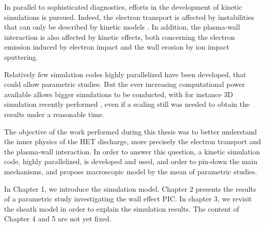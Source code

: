In parallel to sophisticated diagnostics, efforts in the development of kinetic simulations is pursued.
Indeed, the electron transport is affected by instabilities that can only be described by kinetic models \citep{adam2008a,lafleur2016a}.
In addition, the plasma-wall interaction is also affected by kinetic effects, both concerning the electron emission induced by electron impact \citep{barral2003a,raitses2011,sydorenko2006} and the wall erosion by ion impact sputtering.

Relatively few simulation codes highly parallelized have been developed, that could allow parametric studies.
But the ever increasing computational power available allows bigger simulations to be conducted, with for instance \ac{3D} simulation recently performed \citep{fubiani2018,taccogna2012}, even if a scaling still was needed to obtain the results under a reasonable time.

The objective of the work performed during this thesis was to better understand the inner physics of the \ac{HET} discharge, more precisely the electron transport and the plasma-wall interaction. 
In order to answer this question, a kinetic simulation code, highly parallelized, is developed and used, and order to pin-down the main mechanisms, and propose macroscopic model by the mean of parametric studies.

\vspace{1em}
In Chapter 1, we introduce the simulation model.
Chapter 2 presents the results of a parametric study investigating the wall effect PIC.
In chapter 3, we revisit the sheath model in order to explain the simulation results.
The content of Chapter 4 and 5 are not yet fixed.
